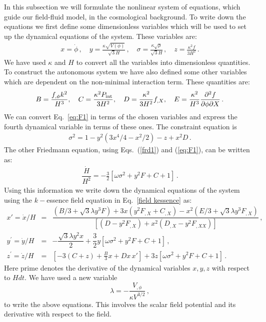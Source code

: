 \documentclass[a4paper,12pt]{article}
\newcommand{\p}{\ensuremath{\partial{}}}
\begin{document}
In this subsection we will formulate the nonlinear system of equations, which guide our field-fluid model, in the cosmological background. To write down the equations we first define some dimensionless variables which will be used to set up the dynamical equations of the system. These variables are:
\begin{eqnarray}
x = \dot{\phi}\,, \quad y = \frac{\kappa\sqrt{V(\phi)}}{\sqrt{3}H}\,, \quad \sigma = \frac{\kappa\sqrt{\rho}}{\sqrt{3}H}\,, \quad z = \frac{\kappa^2 f}{3H^2}\,.
\label{eq:D0}
\end{eqnarray}
We have used $\kappa $ and $H$ to convert all the variables into dimensionless quantities. To construct the autonomous system we have also defined some other variables which are dependent on the non-minimal interaction term. These quantities are: 	
\begin{eqnarray}
B =  \dfrac{f_{,\phi}k^2}{H^3},\quad C= \dfrac{\kappa^2 P_{\rm int}}{3H^2},\quad D = \dfrac{\kappa^2 }{3H^2}f_{,X},\quad E=\frac{\kappa^2}{H^3}\dfrac{\p^2 f}{\p \phi \p X  }\,.
\label{eq:D1}
\end{eqnarray}
%
We can convert Eq.~\eqref{eq:F1} in terms of the chosen variables and express the fourth dynamical variable in terms of these ones. The constraint equation is
%
\begin{eqnarray}
\sigma^2 =  1- y^2\left(3x^4/4-x^2/2\right) -z +  x^2 D\,.
\label{eq:dyn1}
\end{eqnarray}
The other Friedmann equation, using Eqs.~(\ref{frd1}) and (\ref{eq:F1}), can be written as: 
%
\begin{eqnarray}
\dfrac{\dot{H}}{H^2} = -\frac32 [\omega \sigma^2 + y^2 F+C+1]\,.	\label{eq:dyn2}		
\end{eqnarray}
%
Using this information we write down the dynamical equations of the system using the $k-$essence field equation in Eq.~\eqref{field kessence} as:
\begin{eqnarray}
x'=  \dot{x}/H &=& \dfrac{(B/3 + \sqrt{3} \lambda y^3 F) + 3x \left( y^2 F_{,X} + C_{,X}\right)  - x^2(E/3 + \sqrt{3} \lambda y^3 F_{,X})}{[(D - y^2 F_{,X}) + x^2(D_{,X} - y^2 F_{,XX})]} \,,  \label{eq:dynx}\\
y^{\prime}=\dot{y}/H &=& -\dfrac{\sqrt{3}\lambda y^2 x }{2} + \dfrac{3}{2}y  \left[\omega \sigma^2 + y^2 F+C+1 \right]\,,  \label{eq:dyny}\\
z^{\prime}=\dot{z}/H &=&  \left[-3(C+z) + \frac{B}{3}x +D x\, x'  \right]  +      3z\left[\omega \sigma^2 + y^2 F+C+1 \right]\,. \label{eq:dynz}
\end{eqnarray}
Here prime denotes the derivative of the dynamical variables $x,y,z$ with respect to $H dt$. We have used a new variable
$$\lambda = -\dfrac{V_{,\phi}}{\kappa V^{3/2}}\,,$$
to write the above equations. This involves the scalar field potential and its derivative with respect to the field. 
\end{document}
